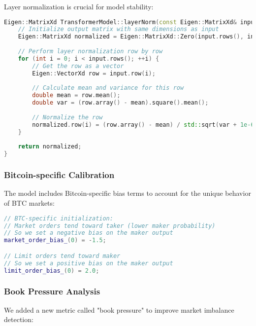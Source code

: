 \documentclass[10pt,twocolumn,a4paper]{IEEEtran}
\begin{document}
Layer normalization is crucial for model stability:

\begin{lstlisting}[language=C++, caption=Layer Normalization Implementation]
Eigen::MatrixXd TransformerModel::layerNorm(const Eigen::MatrixXd& input) {
    // Initialize output matrix with same dimensions as input
    Eigen::MatrixXd normalized = Eigen::MatrixXd::Zero(input.rows(), input.cols());
    
    // Perform layer normalization row by row
    for (int i = 0; i < input.rows(); ++i) {
        // Get the row as a vector
        Eigen::VectorXd row = input.row(i);
        
        // Calculate mean and variance for this row
        double mean = row.mean();
        double var = (row.array() - mean).square().mean();
        
        // Normalize the row
        normalized.row(i) = (row.array() - mean) / std::sqrt(var + 1e-6);
    }
    
    return normalized;
}
\end{lstlisting}

\subsubsection{Bitcoin-specific Calibration}

The model includes Bitcoin-specific bias terms to account for the unique behavior of BTC markets:

\begin{lstlisting}[language=C++, caption=BTC-specific Initialization]
// BTC-specific initialization:
// Market orders tend toward taker (lower maker probability)
// So we set a negative bias on the maker output
market_order_bias_(0) = -1.5;

// Limit orders tend toward maker
// So we set a positive bias on the maker output
limit_order_bias_(0) = 2.0;
\end{lstlisting}

\subsubsection{Book Pressure Analysis}

We added a new metric called "book pressure" to improve market imbalance detection:
\end{document}
